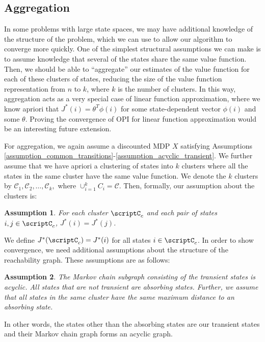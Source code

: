 \documentclass[12pt]{article}
\newtheorem{assumption}{Assumption}
\begin{document}
\subsection{Aggregation}


In some problems with large state spaces, we may have additional knowledge of the structure of the problem, which we can use to allow our algorithm to converge more quickly. One of the simplest structural assumptions we can make is to assume knowledge that several of the states share the same value function. Then, we should be able to ``aggregate'' our estimates of the value function for each of these clusters of states, reducing the size of the value function representation from $n$ to $k$, where $k$ is the number of clusters. In this way, aggregation acts as a very special case of linear function approximation, where we know apriori that $J^*(i) = \theta^T\phi(i)$ for some state-dependent vector $\phi(i)$ and some $\theta$. Proving the convergence of OPI for linear function approximation would be an interesting future extension.

For aggregation, we again assume a discounted MDP $X$ satisfying Assumptions \ref{assumption_common_transitions}-\ref{assumption_acyclic_transient}. We further assume that we have apriori a clustering of states into $k$ clusters where all the states in the same cluster have the same value function. We denote the $k$ clusters by $\mathcal{C}_1, \mathcal{C}_2, \ldots, \mathcal{C}_k,$ where $\cup_{i = 1}^k C_i = \mathcal{C}$. Then, formally, our assumption about the clusters is:
\begin{assumption}
    \label{assumption_clusters} For each cluster $\scriptC_c$ and each pair of states $i,j \in \scriptC_c$, $J^*(i) = J^*(j)$.
\end{assumption}

We define $J^*(\scriptC_c)=J^*(i)$ for all states $i \in \scriptC_c$. In order to show convergence, we need additional assumptions about the structure of the reachability graph. These assumptions are as follows: 
\begin{assumption}\label{assumption_aggregation_tree}
The Markov chain subgraph consisting of the transient states is acyclic. All states that are not transient are absorbing states. Further, we assume that all states in the same cluster have the same maximum distance to an absorbing state.
\end{assumption}
In other words, the states other than the absorbing states are our transient states and their Markov chain graph forms an acyclic graph. %
\end{document}
